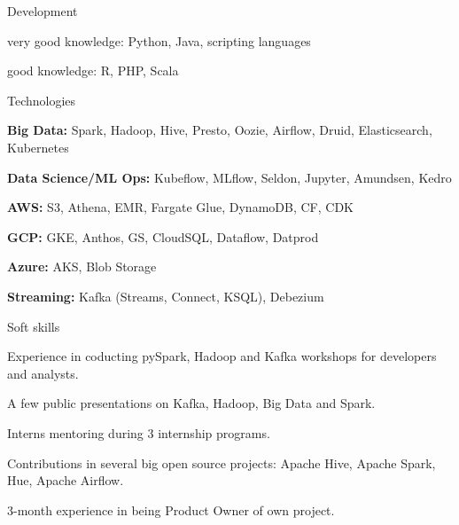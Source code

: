 

\begin{cventries}

  \cventry
    {Development} %
    {} %
    {} %
    {} %
    {
      \begin{cvitems} %
        \item {very good knowledge: Python, Java, scripting languages}
        \item {good knowledge: R, PHP, Scala}
      \end{cvitems}
    }
    
  \cventry
    {Technologies} %
    {} %
    {} %
    {} %
    {
      \begin{cvitems} %
        \item {\textbf{Big Data:} Spark, Hadoop, Hive, Presto, Oozie, Airflow, Druid, Elasticsearch, Kubernetes}
        \item {\textbf{Data Science/ML Ops:} Kubeflow, MLflow, Seldon, Jupyter, Amundsen, Kedro}
        \item {\textbf{AWS:} S3, Athena, EMR, Fargate Glue, DynamoDB, CF, CDK}
        \item {\textbf{GCP:} GKE, Anthos, GS, CloudSQL, Dataflow, Datprod}
        \item {\textbf{Azure:} AKS, Blob Storage}
        \item {\textbf{Streaming:} Kafka (Streams, Connect, KSQL), Debezium}
      \end{cvitems}
    }
    
  \cventry
    {Soft skills} %
    {} %
    {} %
    {} %
    {
      \begin{cvitems} %
        \item {Experience in coducting pySpark, Hadoop and Kafka workshops for developers and analysts.}
        \item {A few public presentations on Kafka, Hadoop, Big Data and Spark.}
        \item {Interns mentoring during 3 internship programs.}
        \item {Contributions in several big open source projects: Apache Hive, Apache Spark, Hue, Apache Airflow.}
        \item{3-month experience in being Product Owner of own project.}
      \end{cvitems}
    }
    

\end{cventries}
